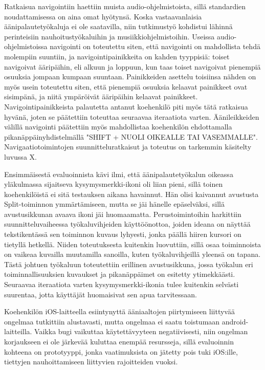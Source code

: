 \documentclass[utf8]{gradu3}
\begin{document}
Ratkaisua navigointiin haettiin muista audio-ohjelmistoista, sillä standardien noudattamisessa on aina omat hyötynsä. Koska vastaavanlaisia äänipalautetyökaluja ei ole saatavilla, niin tutkimustyö kohdistui lähinnä perinteisiin nauhoitustyökaluihin ja musiikkiohjelmistoihin. Useissa audio-ohjelmistoissa navigointi on toteutettu siten, että navigointi on mahdollista tehdä molempiin suuntiin, ja navigointipainikkeita on kahden tyyppisiä: toiset navigoivat ääripäihin, eli alkuun ja loppuun, kun taas toiset navigoivat pienempiä osuuksia jompaan kumpaan suuntaan. Painikkeiden asettelu toisiinsa nähden on myös usein toteutettu siten, että pienempiä osuuksia kelaavat painikkeet ovat sisimpänä, ja niitä ympäröivät ääripäihin kelaavat painikkeet. Navigointipainikkeista palautetta antanut koehenkilö piti myös tätä ratkaisua hyvänä, joten se päätettiin toteuttaa seuraavaa iteraatiota varten. Äänileikkeiden välillä navigointi päätettiin myös mahdollistaa koehenkilön ehdottamalla pikanäppäinyhdistelmällä "SHIFT + NUOLI OIKEALLE TAI VASEMMALLE". Navigaatiotoimintojen suunnitteluratkaisut ja toteutus on tarkemmin käsitelty luvussa X.

Ensimmäisestä evaluoinnista kävi ilmi, että äänipalautetyökalun oikeassa yläkulmassa sijaitseva kysymysmerkki-ikoni oli liian pieni, sillä toinen koehenkilöistä ei sitä testauksen aikana havainnut. Hän olisi kaivannut avustusta Split-toiminnon ymmärtämiseen, mutta se jäi hänelle epäselväksi, sillä avustusikkunan avaava ikoni jäi huomaamatta. Perustoimintoihin harkittiin suunnitteluvaiheessa työkaluvihjeiden käyttöönottoa, joiden ideana on näyttää tekstikentässä sen toiminnon kuvaus lyhyesti, jonka päällä hiiren kursori on tietyllä hetkellä. Niiden toteutuksesta kuitenkin luovuttiin, sillä osaa toiminnoista on vaikeaa kuvailla muutamilla sanoilla, kuten työkaluvihjeillä yleensä on tapana. Tästä johtuen työkaluun toteutettiin erillinen avustusikkuna, jossa työkalun eri toiminnallisuuksien kuvaukset ja pikanäppäimet on esitetty ytimekkäästi. Seuraavaa iteraatiota varten kysymysmerkki-ikonia tulee kuitenkin selvästi suurentaa, jotta käyttäjät huomaisivat sen apua tarvitessaan.

Koehenkilön iOS-laitteella esiintynyttä ääniaaltojen piirtymiseen liittyvää ongelmaa tutkittiin alustavasti, mutta ongelmaa ei saatu toistumaan android-laitteilla. Vaikka bugi vaikuttaa käytettävyyteen negatiivisesti, niin ongelman korjaukseen ei ole järkevää kuluttaa enempää resursseja, sillä evaluoinnin kohteena on prototyyppi, jonka vaatimuksista on jätetty pois tuki iOS:ille, tiettyjen nauhoittamiseen liittyvien rajoitteiden vuoksi. 
\end{document}
